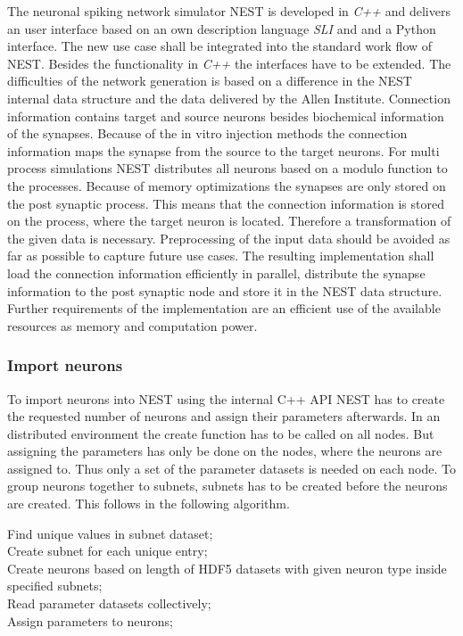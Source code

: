 \documentclass[a4paper]{article}
\begin{document}
The neuronal spiking network simulator NEST is developed in \emph{C++} and delivers
an user interface based on an own description language \emph{SLI} and  and a Python interface.
The new use case shall be integrated into the standard work flow of NEST.
Besides the functionality in \emph{C++} the interfaces have to be extended.
The difficulties of the network generation is based on a difference in 
the NEST internal data structure and the data delivered by the Allen Institute.
Connection information contains target and source neurons besides biochemical
information of the synapses. Because of the in vitro injection methods the
connection information maps the synapse from the source to the target neurons.
For multi process simulations NEST distributes all neurons based on a modulo function 
to the processes. Because of memory optimizations the synapses are only stored on the
post synaptic process. This means that the connection information is stored
on the process, where the target neuron is located. Therefore a transformation of the given data is
necessary. Preprocessing of the input data should be avoided as far as possible to capture
future use cases.
The resulting implementation shall load the connection information efficiently in parallel,
distribute the synapse information to the post synaptic node and store it in
the NEST data structure.
Further requirements of the implementation are an efficient use of the available resources as
memory and computation power. 

\subsubsection{Import neurons}
To import neurons into NEST using the internal C++ API NEST has to create the requested number of neurons and
assign their parameters afterwards. In an distributed environment the create function has to be called on all nodes. But assigning the parameters has only be done on the nodes, where the neurons are assigned to.
Thus only a set of the parameter datasets is needed on each node.
To group neurons together to subnets, subnets has to be created before the neurons are created.
This follows in the following algorithm.

\begin{algorithm}
	Find unique values in subnet dataset; \\
	Create subnet for each unique entry; \\
	Create neurons based on length of HDF5 datasets with given neuron type inside specified subnets; \\
	Read parameter datasets collectively; \\
	Assign parameters to neurons; 
\label{alg2}
\caption{}
\end{algorithm}
\end{document}
